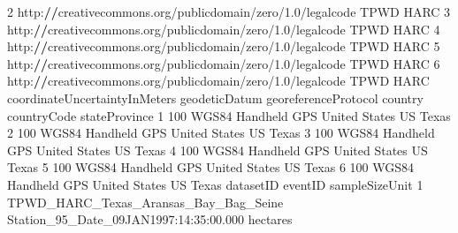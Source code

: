 \documentclass[
]{book}
\newenvironment{Shaded}{\begin{snugshade}}{\end{snugshade}}
\newcommand{\DecValTok}[1]{\textcolor[rgb]{0.00,0.00,0.81}{#1}}
\newcommand{\ErrorTok}[1]{\textcolor[rgb]{0.64,0.00,0.00}{\textbf{#1}}}
\newcommand{\FloatTok}[1]{\textcolor[rgb]{0.00,0.00,0.81}{#1}}
\newcommand{\NormalTok}[1]{#1}
\newcommand{\SpecialCharTok}[1]{\textcolor[rgb]{0.00,0.00,0.00}{#1}}
\begin{document}
\begin{Shaded}
\begin{Highlighting}[]
\DecValTok{2}\NormalTok{ http}\SpecialCharTok{:}\ErrorTok{//}\NormalTok{creativecommons.org}\SpecialCharTok{/}\NormalTok{publicdomain}\SpecialCharTok{/}\NormalTok{zero}\SpecialCharTok{/}\FloatTok{1.0}\SpecialCharTok{/}\NormalTok{legalcode            TPWD                 HARC}
\DecValTok{3}\NormalTok{ http}\SpecialCharTok{:}\ErrorTok{//}\NormalTok{creativecommons.org}\SpecialCharTok{/}\NormalTok{publicdomain}\SpecialCharTok{/}\NormalTok{zero}\SpecialCharTok{/}\FloatTok{1.0}\SpecialCharTok{/}\NormalTok{legalcode            TPWD                 HARC}
\DecValTok{4}\NormalTok{ http}\SpecialCharTok{:}\ErrorTok{//}\NormalTok{creativecommons.org}\SpecialCharTok{/}\NormalTok{publicdomain}\SpecialCharTok{/}\NormalTok{zero}\SpecialCharTok{/}\FloatTok{1.0}\SpecialCharTok{/}\NormalTok{legalcode            TPWD                 HARC}
\DecValTok{5}\NormalTok{ http}\SpecialCharTok{:}\ErrorTok{//}\NormalTok{creativecommons.org}\SpecialCharTok{/}\NormalTok{publicdomain}\SpecialCharTok{/}\NormalTok{zero}\SpecialCharTok{/}\FloatTok{1.0}\SpecialCharTok{/}\NormalTok{legalcode            TPWD                 HARC}
\DecValTok{6}\NormalTok{ http}\SpecialCharTok{:}\ErrorTok{//}\NormalTok{creativecommons.org}\SpecialCharTok{/}\NormalTok{publicdomain}\SpecialCharTok{/}\NormalTok{zero}\SpecialCharTok{/}\FloatTok{1.0}\SpecialCharTok{/}\NormalTok{legalcode            TPWD                 HARC}
\NormalTok{  coordinateUncertaintyInMeters geodeticDatum georeferenceProtocol       country countryCode stateProvince}
\DecValTok{1}                           \DecValTok{100}\NormalTok{         WGS84         Handheld GPS United States          US         Texas}
\DecValTok{2}                           \DecValTok{100}\NormalTok{         WGS84         Handheld GPS United States          US         Texas}
\DecValTok{3}                           \DecValTok{100}\NormalTok{         WGS84         Handheld GPS United States          US         Texas}
\DecValTok{4}                           \DecValTok{100}\NormalTok{         WGS84         Handheld GPS United States          US         Texas}
\DecValTok{5}                           \DecValTok{100}\NormalTok{         WGS84         Handheld GPS United States          US         Texas}
\DecValTok{6}                           \DecValTok{100}\NormalTok{         WGS84         Handheld GPS United States          US         Texas}
\NormalTok{                              datasetID                                eventID sampleSizeUnit}
\DecValTok{1}\NormalTok{ TPWD\_HARC\_Texas\_Aransas\_Bay\_Bag\_Seine Station\_95\_Date\_09JAN1997}\SpecialCharTok{:}\DecValTok{14}\SpecialCharTok{:}\DecValTok{35}\SpecialCharTok{:}\FloatTok{00.000}\NormalTok{       hectares}

\end{Highlighting}
\end{Shaded}
\end{document}
